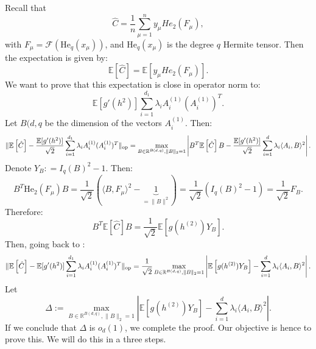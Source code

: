 \documentclass[]{article}
\numberwithin{equation}{section}
\theoremstyle{definition}
\newcommand{\RR}{\mathbb{R}}
\newcommand{\EE}{\mathbb{E}}
\def\op{{\rm op}}
\newcommand{\He}{\mathord{\mathrm{He}}}
\begin{document}
Recall that
\begin{equation}
    \hat{C} = \dfrac{1}{n} \sum_{\mu = 1}^{n} y_\mu He_2(F_\mu), 
\end{equation}
with $F_\mu = \mathcal{F}(\He_{q}(x_\mu))$, and $\He_{q}(x_\mu)$ is the degree $q$ Hermite tensor. Then the expectation is given by: 
\begin{equation}
    \EE \left [ \hat{C}\right ] = \EE \left [ y_\mu He_2(F_\mu)\right].
\end{equation} 
We want to prove that this expectation is close in operator norm to: 
\begin{equation}
    \EE[g'(h^2)] \sum_{i=1}^{d_1} \lambda_i A^{(1)}_i (A_i^{(1)})^T. 
\end{equation}
Let $B(d,q$ be the dimension of the vectors $A^{(1)}_i$. Then: 
\begin{align}
    \| \EE\left [\hat{C} \right ] -  \dfrac{\EE[g'(h^2)]}{\sqrt{2}} \sum_{i=1}^{d_1} \lambda_i A^{(1)}_i (A_i^{(1)})^T\|_\op  = \max_{B \in \RR^{B(d,q)}, \| B\|_2 = 1} \left | B^T \EE\left[ \hat{C} \right ] B - \dfrac{\EE[g'(h^2)]}{\sqrt{2}} \sum_{i=1}^{d} \lambda_i \langle A_i, B \rangle^{2}\right |. 
    \label{eq:operator_norm_subtraction_1}
\end{align}
Denote $Y_{B} : = I_{q}(B)^{2}-1$. Then: 
\begin{equation}
    B^T \He_{2}(F_{\mu}) B = \dfrac{1}{\sqrt{2}} (\langle B, F_\mu\rangle^{2}-\underbrace{1}_{=\| B\|^2}) = \dfrac{1}{\sqrt{2}}(I_{q}(B)^{2}-1) = \dfrac{1}{\sqrt{2}} F_{B}.
\end{equation}
Therefore:
\begin{equation}
    B^T \EE\left[ \hat{C} \right ] B = \dfrac{1}{\sqrt{2}}\EE \left [ g(h^{(2)})Y_{B}\right ].
\end{equation}
Then, going back to :
\begin{equation}
    \| \EE\left [\hat{C} \right ] -  \EE[g'(h^2)] \sum_{i=1}^{d_1} \lambda_i A^{(1)}_i (A_i^{(1)})^T\|_\op  = \dfrac{1}{\sqrt{2}}\max_{B \in \RR^{B(d,q)}, \| B\|_2 = 1} \left | \EE \left [ g(h^{(2)})Y_{B}\right ]- \sum_{i=1}^{d} \lambda_i \langle A_i, B \rangle^{2}\right |.
\end{equation}
Let
\begin{equation}
    \Delta:=\max_{B \in \RR^{B(d,q)}, \| B\|_2 = 1} \left | \EE \left [ g(h^{(2)})Y_{B}\right ]- \sum_{i=1}^{d} \lambda_i \langle A_i, B \rangle^{2}\right |.
    \label{eq:operator_norm_subtraction}
\end{equation}
If we conclude that $\Delta$ is $o_{d}(1)$, we complete the proof. Our objective is hence to prove this. We will do this in a three steps.
\end{document}
